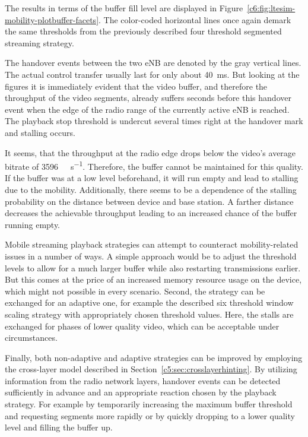 The results in terms of the buffer fill level are displayed in Figure~\ref{c6:fig:ltesim-mobility-plotbuffer-facets}. The color-coded horizontal lines once again demark the same thresholds from the previously described four threshold segmented streaming strategy.

The handover events between the two \gls{eNB} are denoted by the gray vertical lines. The actual control transfer usually last for only about \SI{40}{\milli\second}. But looking at the figures it is immediately evident that the video buffer, and therefore the throughput of the video segments, already suffers seconds before this handover event when the edge of the radio range of the currently active \gls{eNB} is reached. The playback stop threshold is undercut several times right at the handover mark and stalling occurs.

It seems, that the throughput at the radio edge drops below the video's average bitrate of \SI{3596}{\kilo\bit\per\second}. Therefore, the buffer cannot be maintained for this quality. If the buffer was at a low level beforehand, it will run empty and lead to stalling due to the mobility. Additionally, there seems to be a dependence of the stalling probability on the distance between device and base station. A farther distance decreases the achievable throughput leading to an increased chance of the buffer running empty.

Mobile streaming playback strategies can attempt to counteract mobility-related issues in a number of ways. A simple approach would be to adjust the threshold levels to allow for a much larger buffer while also restarting transmissions earlier. But this comes at the price of an increased memory resource usage on the device, which might not possible in every scenario. Second, the strategy can be exchanged for an adaptive one, for example the described six threshold window scaling strategy with appropriately chosen threshold values. Here, the stalls are exchanged for phases of lower quality video, which can be acceptable under circumstances. 

Finally, both non-adaptive and adaptive strategies can be improved by employing the cross-layer model described in Section~\ref{c5:sec:crosslayerhinting}. By utilizing information from the radio network layers, handover events can be detected sufficiently in advance and an appropriate reaction chosen by the playback strategy. For example by temporarily increasing the maximum buffer threshold and requesting segments more rapidly or by quickly dropping to a lower quality level and filling the buffer up.

